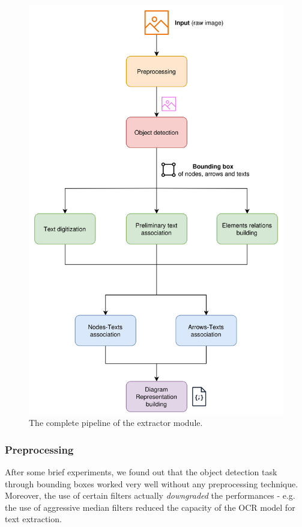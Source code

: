 \documentclass[conference]{IEEEtran}
\begin{document}
\begin{figure}[H]
	\centering
	\includegraphics[width=\linewidth]{flowchart-extractor.png}
	\caption{The complete pipeline of the extractor module.}
	\label{fig:flowchart-extractor}
\end{figure}

\subsubsection{Preprocessing}
After some brief experiments, we found out that the object detection task through bounding boxes worked very well without any preprocessing technique. Moreover, the use of certain filters actually \textit{downgraded} the performances - e.g. the use of aggressive median filters reduced the capacity of the OCR model for text extraction.
\end{document}
